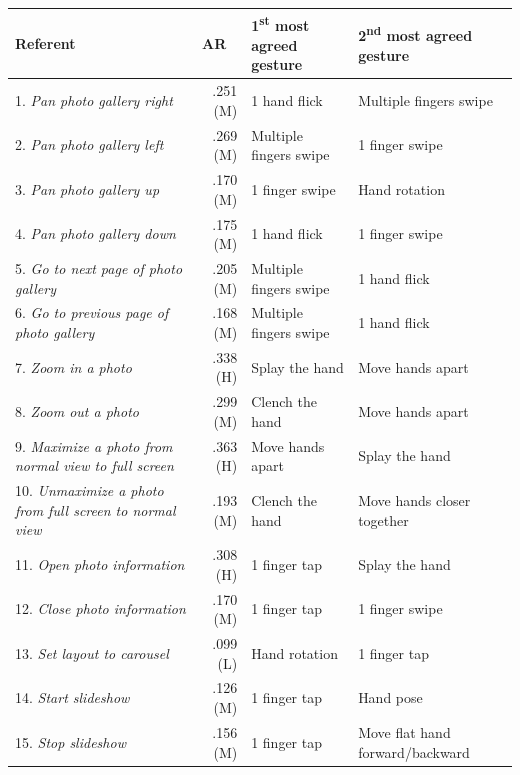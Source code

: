 \begin{table}[ht]
	\renewcommand{\arraystretch}{1.1}
	\captionsetup{justification=centering}
	\footnotesize
	\begin{tabular}{p{3.35cm}rp{2.875cm}p{2.975cm}}
		\toprule
		\textbf{Referent} & \multicolumn{1}{l}{\textbf{AR}} & \textbf{1\textsuperscript{st} most agreed gesture} & \textbf{2\textsuperscript{nd} most agreed gesture} \\
		\midrule
		1. \textit{Pan photo gallery right} & \cellcolor{highlightcolor} .251 (M) & 1 hand flick & Multiple fingers swipe\\
        2. \textit{Pan photo gallery left} & \cellcolor{highlightcolor} .269 (M) & Multiple fingers swipe & 1 finger swipe\\
        3. \textit{Pan photo gallery up} & .170 (M) & 1 finger swipe & Hand rotation\\
        4. \textit{Pan photo gallery down} & .175 (M) & 1 hand flick & 1 finger swipe\\
        5. \textit{Go to next page of photo gallery} & .205 (M) & Multiple fingers swipe & 1 hand flick\\
        6. \textit{Go to previous page of photo gallery} & .168 (M) & Multiple fingers swipe & 1 hand flick\\
        7. \textit{Zoom in a photo} & \cellcolor{highlightcolor} .338 (H) & Splay the hand & Move hands apart\\
        8. \textit{Zoom out a photo} & \cellcolor{highlightcolor} .299 (M) & Clench the hand & Move hands apart\\
        9. \textit{Maximize a photo from normal view to full screen} & \cellcolor{highlightcolor} .363 (H) & Move hands apart & Splay the hand\\
        10. \textit{Unmaximize a photo from full screen to normal view} & .193 (M) & Clench the hand & Move hands closer together\\
        11. \textit{Open photo information} & \cellcolor{highlightcolor} .308 (H) & 1 finger tap & Splay the hand\\
        12. \textit{Close photo information} & .170 (M) & 1 finger tap & 1 finger swipe\\
        13. \textit{Set layout to carousel} & .099 (L) & Hand rotation & 1 finger tap\\
        14. \textit{Start slideshow} & .126 (M) & 1 finger tap & Hand pose\\
        15. \textit{Stop slideshow} & .156 (M) & 1 finger tap & Move flat hand forward/backward\\

\end{tabular}
\end{table}
